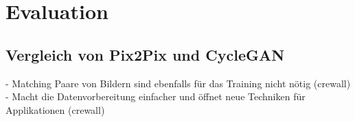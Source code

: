 \chapter{Evaluation}

\section{Vergleich von Pix2Pix und CycleGAN}
- Matching Paare von Bildern sind ebenfalls für das Training nicht nötig (crewall)
- Macht die Datenvorbereitung einfacher und öffnet neue Techniken für Applikationen (crewall)